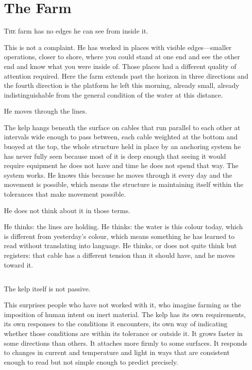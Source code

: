 
\chapter{The Farm}


\lettrine{T}{he} farm has no edges he can see from inside it.

This is not a complaint. He has worked in places with
visible edges---smaller operations, closer to shore,
where you could stand at one end and see the other end
and know what you were inside of. Those places had a
different quality of attention required. Here the farm
extends past the horizon in three directions and the
fourth direction is the platform he left this morning,
already small, already indistinguishable from the
general condition of the water at this distance.

He moves through the lines.

The kelp hangs beneath the surface on cables that run
parallel to each other at intervals wide enough to pass
between, each cable weighted at the bottom and buoyed
at the top, the whole structure held in place by an
anchoring system he has never fully seen because most
of it is deep enough that seeing it would require
equipment he does not have and time he does not spend
that way. The system works. He knows this because he
moves through it every day and the movement is possible,
which means the structure is maintaining itself within
the tolerances that make movement possible.

He does not think about it in those terms.

He thinks: the lines are holding. He thinks: the water
is this colour today, which is different from yesterday's
colour, which means something he has learned to read
without translating into language. He thinks, or does
not quite think but registers: that cable has a different
tension than it should have, and he moves toward it.

\section{}

The kelp itself is not passive.

This surprises people who have not worked with it,
who imagine farming as the imposition of human intent
on inert material. The kelp has its own requirements,
its own responses to the conditions it encounters,
its own way of indicating whether those conditions are
within its tolerance or outside it. It grows faster
in some directions than others. It attaches more
firmly to some surfaces. It responds to changes in
current and temperature and light in ways that are
consistent enough to read but not simple enough to
predict precisely.

